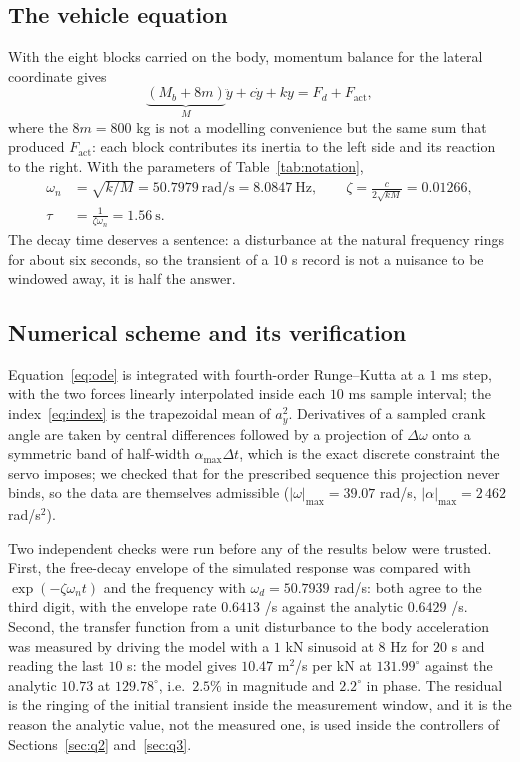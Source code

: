 \documentclass[12pt]{apmcmthesis}
\begin{document}
\subsection{The vehicle equation}
With the eight blocks carried on the body, momentum balance for the lateral coordinate gives
\begin{equation}
\underbrace{(M_b+8m)}_{M}\ddot y+c\dot y+ky=F_d+F_{\text{act}},
\label{eq:ode}
\end{equation}
where the $8m=800$ kg is not a modelling convenience but the same sum that produced
$F_{\text{act}}$: each block contributes its inertia to the left side and its reaction to the
right. With the parameters of Table~\ref{tab:notation},
\begin{equation}
\begin{aligned}
\omega_n&=\sqrt{k/M}=50.7979\ \text{rad/s}=8.0847\ \text{Hz},\qquad
\zeta=\frac{c}{2\sqrt{kM}}=0.01266,\\
\tau&=\frac{1}{\zeta\omega_n}=1.56\ \text{s}.
\end{aligned}
\label{eq:wn}
\end{equation}
The decay time deserves a sentence: a disturbance at the natural frequency rings for about six
seconds, so the transient of a $10$ s record is not a nuisance to be windowed away, it is half the
answer.

\subsection{Numerical scheme and its verification}
Equation~\eqref{eq:ode} is integrated with fourth-order Runge--Kutta at a $1$ ms step, with the two
forces linearly interpolated inside each $10$ ms sample interval; the index~\eqref{eq:index} is
the trapezoidal mean of $a_y^2$. Derivatives of a sampled crank angle are taken by central
differences followed by a projection of $\Delta\omega$ onto a symmetric band of half-width
$\alpha_{\max}\Delta t$, which is the exact discrete constraint the servo imposes; we checked that
for the prescribed sequence this projection never binds, so the data are themselves admissible
($|\omega|_{\max}=39.07$ rad/s, $|\alpha|_{\max}=2\,462$ rad/s$^2$).

Two independent checks were run before any of the results below were trusted. First, the
free-decay envelope of the simulated response was compared with $\exp(-\zeta\omega_n t)$ and the
frequency with $\omega_d=50.7939$ rad/s: both agree to the third digit, with the envelope rate
$0.6413$ /s against the analytic $0.6429$ /s. Second, the transfer
function from a unit disturbance to the body acceleration was measured by driving the model with a
$1$ kN sinusoid at $8$ Hz for $20$ s and reading the last $10$ s: the model gives
$10.47$ m$^2$/s per kN at $131.99^\circ$ against the analytic
$10.73$ at $129.78^\circ$, i.e.\ $2.5\%$ in magnitude and $2.2^\circ$ in phase. The residual is the
ringing of the initial transient inside the measurement window, and it is the reason the analytic
value, not the measured one, is used inside the controllers of Sections~\ref{sec:q2}
and~\ref{sec:q3}.
\end{document}
